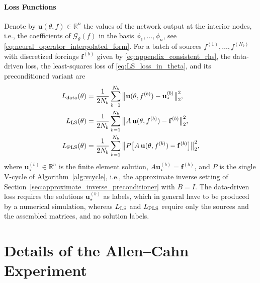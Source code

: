 \documentclass{article} %
\begin{document}
\paragraph{Loss Functions} Denote by $\mathbf u(\theta, f)\in\mathbb R^n$ the values of the network output at the interior nodes, i.e., the coefficients of $\mathcal G_\theta(f)$ in the basis $\phi_1,\dots,\phi_n$, see \eqref{eq:neural_operator_interpolated_form}. For a batch of sources $f^{(1)},\dots,f^{(N_b)}$ with discretized forcings $\mathbf f^{(b)}$ given by \eqref{eq:appendix_consistent_rhs}, the data-driven loss, the least-squares loss of \eqref{eq:LS_loss_in_theta}, and its preconditioned variant are
\begin{align}\label{eq:appendix_poisson_losses}
   \begin{split}
      L_{\textup{data}}(\theta) &= \frac{1}{2N_b}\sum_{b=1}^{N_b} \big\| \mathbf u(\theta, f^{(b)}) - \mathbf u_\star^{(b)} \big\|_2^2,
      \\
      L_{\textup{LS}}(\theta) &= \frac{1}{2N_b}\sum_{b=1}^{N_b} \big\| A\,\mathbf u(\theta, f^{(b)}) - \mathbf f^{(b)} \big\|_2^2,
      \\
      L_{\textup{PLS}}(\theta) &= \frac{1}{2N_b}\sum_{b=1}^{N_b} \big\| P\big[A\,\mathbf u(\theta, f^{(b)}) - \mathbf f^{(b)}\big] \big\|_2^2,
   \end{split}
\end{align}
where $\mathbf u_\star^{(b)}\in\mathbb R^n$ is the finite element solution, $A\mathbf u_\star^{(b)} = \mathbf f^{(b)}$, and $P$ is the single V-cycle of Algorithm~\ref{alg:vcycle}, i.e., the approximate inverse setting of Section~\ref{sec:approximate_inverse_preconditioner} with $B = I$. The data-driven loss requires the solutions $\mathbf u_\star^{(b)}$ as labels, which in general have to be produced by a numerical simulation, whereas $L_{\textup{LS}}$ and $L_{\textup{PLS}}$ require only the sources and the assembled matrices, and no solution labels.

\section{Details of the Allen--Cahn Experiment}\label{appendix:details_allen_cahn}
\end{document}

